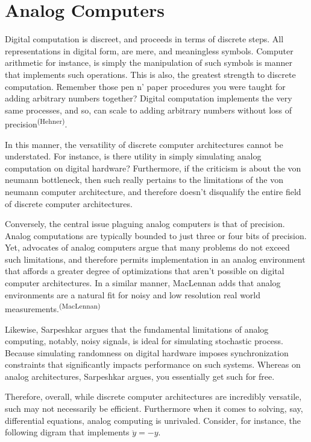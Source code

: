 \section*{Analog Computers}

Digital computation is discreet, and proceeds in terms of discrete steps. All representations in digital form, are mere, and meaningless symbols. Computer arithmetic for instance, is simply the manipulation of such symbols is manner that implements such operations. This is also, the greatest strength to discrete computation. Remember those pen n' paper procedures you were taught for adding arbitrary numbers together? Digital computation implements the very same processes, and so, can scale to adding arbitrary numbers without loss of precision\textsuperscript{(Hehner)}.

In this manner, the versatility of discrete computer architectures cannot be understated. For instance, is there utility in simply simulating analog computation on digital hardware? Furthermore, if the criticism is about the von neumann bottleneck, then such really pertains to the limitations of the von neumann computer architecture, and therefore doesn't disqualify the entire field of discrete computer architectures.

Conversely, the central issue plaguing analog computers is that of precision. Analog computations are typically bounded to just three or four bits of precision. Yet, advocates of analog computers argue that many problems do not exceed such limitations, and therefore permits implementation in an analog environment that affords a greater degree of optimizations that aren't possible on digital computer architectures. In a similar manner, MacLennan adds that analog environments are a natural fit for noisy and low resolution real world measurements.\textsuperscript{(MacLennan)}

Likewise, Sarpeshkar argues that the fundamental limitations of analog computing, notably, noisy signals, is ideal for simulating stochastic process. Because simulating randomness on digital hardware imposes synchronization constraints that significantly impacts performance on such systems. Whereas on analog architectures, Sarpeshkar argues, you essentially get such for free.

Therefore, overall, while discrete computer architectures are incredibly versatile, such may not necessarily be efficient. Furthermore when it comes to solving, say, differential equations, analog computing is unrivaled. Consider, for instance, the following digram that implements $\ddot{y} = -y$. 

